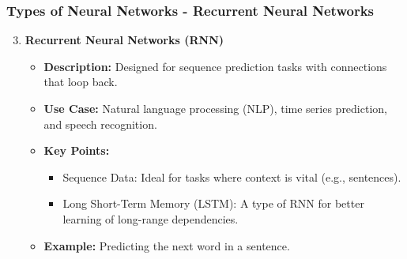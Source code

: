 \documentclass[aspectratio=169]{beamer}
\begin{document}
\begin{frame}[fragile]
    \frametitle{Types of Neural Networks - Recurrent Neural Networks}
    \begin{enumerate}
        \setcounter{enumi}{2}
        \item \textbf{Recurrent Neural Networks (RNN)}
        \begin{itemize}
            \item \textbf{Description:} Designed for sequence prediction tasks with connections that loop back.
            \item \textbf{Use Case:} Natural language processing (NLP), time series prediction, and speech recognition.
            \item \textbf{Key Points:}
            \begin{itemize}
                \item Sequence Data: Ideal for tasks where context is vital (e.g., sentences).
                \item Long Short-Term Memory (LSTM): A type of RNN for better learning of long-range dependencies.
            \end{itemize}
            \item \textbf{Example:} Predicting the next word in a sentence.
        \end{itemize}
    \end{enumerate}
\end{frame}
\end{document}
